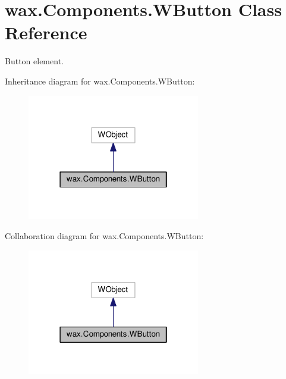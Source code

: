 \hypertarget{classwax_1_1Components_1_1WButton}{}\section{wax.\+Components.\+W\+Button Class Reference}
\label{classwax_1_1Components_1_1WButton}


Button element.  




Inheritance diagram for wax.\+Components.\+W\+Button\+:
\nopagebreak
\begin{figure}[H]
\begin{center}
\leavevmode
\includegraphics[width=214pt]{classwax_1_1Components_1_1WButton__inherit__graph}
\end{center}
\end{figure}


Collaboration diagram for wax.\+Components.\+W\+Button\+:
\nopagebreak
\begin{figure}[H]
\begin{center}
\leavevmode
\includegraphics[width=214pt]{classwax_1_1Components_1_1WButton__coll__graph}
\end{center}
\end{figure}
